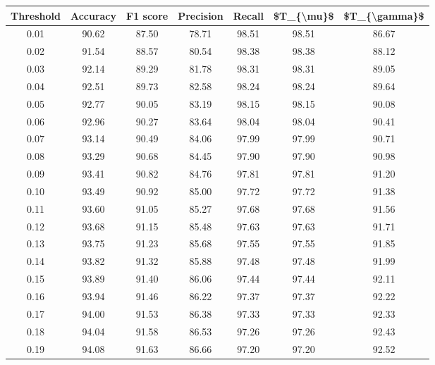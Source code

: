 \begin{tabular}{|c|c|c|c|c|c|c|}
\hline
 Threshold &  Accuracy &  F1 score &  Precision &  Recall &  \$T\_\{\textbackslash mu\}\$ &  \$T\_\{\textbackslash gamma\}\$ \\
\hline
      0.01 &     90.62 &     87.50 &      78.71 &   98.51 &      98.51 &         86.67 \\
      0.02 &     91.54 &     88.57 &      80.54 &   98.38 &      98.38 &         88.12 \\
      0.03 &     92.14 &     89.29 &      81.78 &   98.31 &      98.31 &         89.05 \\
      0.04 &     92.51 &     89.73 &      82.58 &   98.24 &      98.24 &         89.64 \\
      0.05 &     92.77 &     90.05 &      83.19 &   98.15 &      98.15 &         90.08 \\
      0.06 &     92.96 &     90.27 &      83.64 &   98.04 &      98.04 &         90.41 \\
      0.07 &     93.14 &     90.49 &      84.06 &   97.99 &      97.99 &         90.71 \\
      0.08 &     93.29 &     90.68 &      84.45 &   97.90 &      97.90 &         90.98 \\
      0.09 &     93.41 &     90.82 &      84.76 &   97.81 &      97.81 &         91.20 \\
      0.10 &     93.49 &     90.92 &      85.00 &   97.72 &      97.72 &         91.38 \\
      0.11 &     93.60 &     91.05 &      85.27 &   97.68 &      97.68 &         91.56 \\
      0.12 &     93.68 &     91.15 &      85.48 &   97.63 &      97.63 &         91.71 \\
      0.13 &     93.75 &     91.23 &      85.68 &   97.55 &      97.55 &         91.85 \\
      0.14 &     93.82 &     91.32 &      85.88 &   97.48 &      97.48 &         91.99 \\
      0.15 &     93.89 &     91.40 &      86.06 &   97.44 &      97.44 &         92.11 \\
      0.16 &     93.94 &     91.46 &      86.22 &   97.37 &      97.37 &         92.22 \\
      0.17 &     94.00 &     91.53 &      86.38 &   97.33 &      97.33 &         92.33 \\
      0.18 &     94.04 &     91.58 &      86.53 &   97.26 &      97.26 &         92.43 \\
      0.19 &     94.08 &     91.63 &      86.66 &   97.20 &      97.20 &         92.52 \\

\end{tabular}
